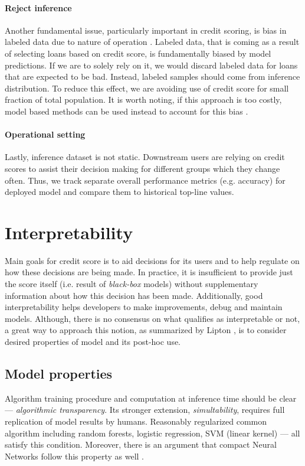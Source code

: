 \documentclass{article}
\begin{document}
\paragraph{Reject inference}
Another fundamental issue, particularly important in credit scoring, is bias in labeled data due to nature of operation \cite{practical}. Labeled data, that is coming as a result of selecting loans based on credit score, is fundamentally biased by model predictions. If we are to solely rely on it, we would discard labeled data for loans that are expected to be bad. Instead, labeled samples should come from inference distribution. To reduce this effect, we are avoiding use of credit score for small fraction of total population. It is worth noting, if this approach is too costly, model based methods can be used instead to account for this bias \cite{credit-reject-inference, credit-reject-inference-dnn}.

\paragraph{Operational setting}
Lastly, inference dataset is not static. Downstream users are relying on credit scores to assist their decision making for different groups which they change often. Thus, we track separate overall performance metrics (e.g. accuracy) for deployed model and compare them to historical top-line values.

\section{Interpretability}
\label{sec:interpret}

Main goals for credit score is to aid decisions for its users and to help regulate on how these decisions are being made. In practice, it is insufficient to provide just the score itself (i.e. result of \textit{black-box} models) without supplementary information about how this decision has been made. Additionally, good interpretability helps developers to make improvements, debug and maintain models. Although, there is no consensus on what qualifies as interpretable or not, a great way to approach this notion, as summarized by Lipton \cite{interpret}, is to consider desired properties of model and its post-hoc use.

\subsection{Model properties}
Algorithm training procedure and computation at inference time should be clear --- \textit{algorithmic transparency}. Its stronger extension, \textit{simultability}, requires full replication of model results by humans. Reasonably regularized common algorithm including random forests, logistic regression, SVM (linear kernel) --- all satisfy this condition. Moreover, there is an argument that compact Neural Networks follow this property as well \cite{interpret}.
\end{document}
